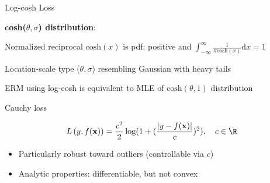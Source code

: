 \documentclass[11pt,compress,t,notes=noshow, xcolor=table]{beamer}
\begin{document}
\begin{frame}{Log-cosh Loss }

\textbf{cosh($\theta,\sigma$) distribution}:\\

\begin{itemizeL}

\item Normalized reciprocal $\text{cosh}(x)$ is pdf: 
positive and $\int_{-\infty}^{\infty} \frac{1}{\pi \text{cosh}(x)} \text{d}x = 1$

\item Location-scale type ($\theta, \sigma$) 
resembling Gaussian with heavy tails

\item ERM using log-cosh 
is equivalent to MLE of $\text{cosh}(\theta,1)$ distribution

\end{itemizeL}

\vfill

{}


\end{frame}

\begin{frame}{Cauchy loss}


$$
\Lxy = \frac{c^2}{2} \log ( 1 + ( \frac{\left|y - \fx\right|}{c})^2 ), 
\quad c \in \R
$$

\begin{itemize}
\item Particularly robust toward outliers (controllable via $c$)
\item Analytic properties: differentiable, but not convex
\end{itemize}

\vfill




\end{frame}
\end{document}

